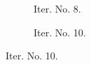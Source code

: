 \documentclass[a4paper,12pt]{amsart}
\numberwithin{equation}{section}
\begin{document}
\begin{figure}[h!]
\begin{subfigure}[t]{0.49\textwidth}
    \caption{Iter. No. 8.}
\end{subfigure}
	\hfill
\begin{subfigure}[t]{0.49\textwidth}
    \caption{Iter. No. 10.}
\end{subfigure}


\end{figure}
\end{document}
